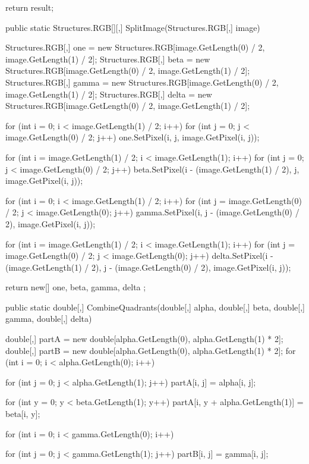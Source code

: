 \begin{flushleft}
\begin{cscode}
{{        return result;
    }

    public static Structures.RGB[][,] SplitImage(Structures.RGB[,] image)
    {
        Structures.RGB[,] one = new Structures.RGB[image.GetLength(0) / 2, image.GetLength(1) / 2];
        Structures.RGB[,] beta = new Structures.RGB[image.GetLength(0) / 2, image.GetLength(1) / 2];
        Structures.RGB[,] gamma = new Structures.RGB[image.GetLength(0) / 2, image.GetLength(1) / 2];
        Structures.RGB[,] delta = new Structures.RGB[image.GetLength(0) / 2, image.GetLength(1) / 2];

        for (int i = 0; i < image.GetLength(1) / 2; i++)
        {
            for (int j = 0; j < image.GetLength(0) / 2; j++)
            {
                one.SetPixel(i, j, image.GetPixel(i, j));
            }
        }

        for (int i = image.GetLength(1) / 2; i < image.GetLength(1); i++)
        {
            for (int j = 0; j < image.GetLength(0) / 2; j++)
            {
                beta.SetPixel(i - (image.GetLength(1) / 2), j, image.GetPixel(i, j));
            }
        }

        for (int i = 0; i < image.GetLength(1) / 2; i++)
        {
            for (int j = image.GetLength(0) / 2; j < image.GetLength(0); j++)
            {
                gamma.SetPixel(i, j - (image.GetLength(0) / 2), image.GetPixel(i, j));
            }
        }

        for (int i = image.GetLength(1) / 2; i < image.GetLength(1); i++)
        {
            for (int j = image.GetLength(0) / 2; j < image.GetLength(0); j++)
            {
                delta.SetPixel(i - (image.GetLength(1) / 2), j - (image.GetLength(0) / 2), image.GetPixel(i, j));
            }
        }

        return new[] { one, beta, gamma, delta };
    }

    public static double[,] CombineQuadrants(double[,] alpha, double[,] beta, double[,] gamma, double[,] delta)
    {
        double[,] partA = new double[alpha.GetLength(0), alpha.GetLength(1) * 2];
        double[,] partB = new double[alpha.GetLength(0), alpha.GetLength(1) * 2];
        for (int i = 0; i < alpha.GetLength(0); i++)
        {
            for (int j = 0; j < alpha.GetLength(1); j++)
                partA[i, j] = alpha[i, j];

            for (int y = 0; y < beta.GetLength(1); y++)
                partA[i, y + alpha.GetLength(1)] = beta[i, y];
        }

        for (int i = 0; i < gamma.GetLength(0); i++)
        {
            for (int j = 0; j < gamma.GetLength(1); j++)
                partB[i, j] = gamma[i, j];

}}}
\end{cscode}
\end{flushleft}

